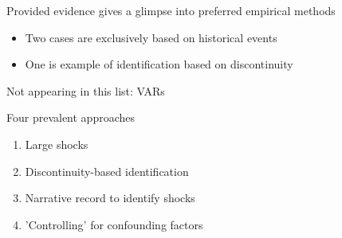 \documentclass{beamer}
\begin{document}
\begin{frame}
  Provided evidence gives a glimpse into preferred empirical methods
  \begin{itemize}
    \item Two cases are exclusively based on historical events
    \item One is example of identification based on discontinuity
  \end{itemize}
  \medskip
  Not appearing in this list: VARs
\end{frame}

\begin{frame}
  Four prevalent approaches
  \begin{enumerate}
    \item Large shocks
    \item Discontinuity-based identification
    \item Narrative record to identify shocks
    \item 'Controlling' for confounding factors
  \end{enumerate}
\end{frame}
\end{document}
